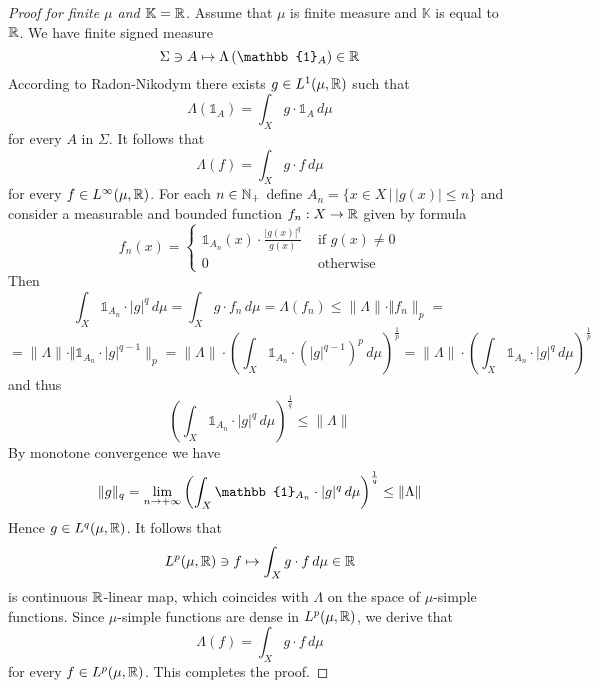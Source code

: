 \begin{proof}[Proof for finite $\mu$ and $\mathbb{K}={\mathbb R}$]
  Assume that $\mu$ is finite measure and $\mathbb{K}$ is equal to ${\mathbb R}$. We have finite signed measure
  $$\Sigma \ni A \mapsto  \Lambda\left(\mathbb{1}_A\right) \in \RR$$
  According to Radon-Nikodym there exists $g \in L^1(\mu,{\mathbb R})$ such that
  $$\Lambda\left(\mathbb{1}_A\right) = \int_Xg\cdot \mathbb{1}_A\,d\mu$$
  for every $A$ in $\Sigma$. It follows that
  $$\Lambda(f) = \int_Xg\cdot f\,d\mu$$
  for every $f \in L^{\infty}(\mu,{\mathbb R})$. For each $n \in {\mathbb N}_+$ define $A_n = \big\{x\in X\,\big|\,|g(x)|\leq n\big\}$ and consider a measurable and bounded function $f_n:X\rightarrow {\mathbb R}$ given by formula
  $$f_n(x) = \begin{cases}
      \mathbb{1}_{A_n}(x)\cdot \frac{|g(x)|^q}{g(x)} & \mbox{ if }g(x) \neq 0 \\
      0                                              & \mbox{ otherwise }
    \end{cases}
  $$
  Then
  $$\int_X \mathbb{1}_{A_n} \cdot |g|^{q}\,d\mu = \int_X g \cdot f_n\,d\mu = \Lambda\left(f_n\right) \leq \lVert \Lambda \rVert\cdot \Vert f_n \rVert_p = $$
  $$= \lVert \Lambda \rVert\cdot \Vert \mathbb{1}_{A_n}\cdot |g|^{q-1}\rVert_p = \lVert \Lambda \rVert\cdot \left(\int_X \mathbb{1}_{A_n}\cdot\left(|g|^{q-1}\right)^p\,d\mu\right)^{\frac{1}{p}} = \lVert \Lambda \rVert\cdot \left(\int_X \mathbb{1}_{A_n}\cdot |g|^{q}\,d\mu\right)^{\frac{1}{p}}$$
  and thus
  $$\left(\int_X \mathbb{1}_{A_n} \cdot |g|^{q}\,d\mu\right)^{\frac{1}{q}} \leq \lVert \Lambda \rVert$$
  By monotone convergence we have
  $$\lVert g \rVert_q = \lim_{n\ra +\infty}\left(\int_X \mathbb{1}_{A_n} \cdot |g|^{q}\,d\mu\right)^{\frac{1}{q}} \leq \lVert \Lambda \rVert$$
  Hence $g \in L^q(\mu,{\mathbb R})$. It follows that
  $$L^p(\mu,{\mathbb R}) \ni f \mapsto \int_{X}g\cdot f\,d\mu \in {\mathbb R}$$
  is continuous ${\mathbb R}$-linear map, which coincides with $\Lambda$ on the space of $\mu$-simple functions. Since $\mu$-simple functions are dense in $L^p(\mu,{\mathbb R})$, we derive that
  $$\Lambda(f) = \int_{X}g\cdot f\,d\mu$$
  for every $f \in L^p(\mu,{\mathbb R})$. This completes the proof.
\end{proof}

